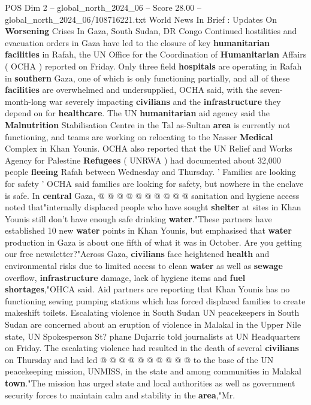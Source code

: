 \begin{textsample}{POS Dim 2 – global\_north\_2024\_06 – Score 28.00 – global\_north\_2024\_06/108716221.txt}  \label{ex:f2_pos_257}
World News In Brief : Updates On \textbf{Worsening} Crises In Gaza, South Sudan, DR Congo Continued hostilities and evacuation orders in Gaza have led to the closure of key \textbf{humanitarian} \textbf{facilities} in Rafah, the UN Office for the Coordination of \textbf{Humanitarian} Affairs ( OCHA ) reported on Friday.
Only three field \textbf{hospitals} are operating in Rafah in \textbf{southern} Gaza, one of which is only functioning partially, and all of these \textbf{facilities} are overwhelmed and undersupplied, OCHA said, with the seven-month-long war severely impacting \textbf{civilians} and the \textbf{infrastructure} they depend on for \textbf{healthcare}.
The UN \textbf{humanitarian} aid agency said the \textbf{Malnutrition} Stabilisation Centre in the Tal as-Sultan \textbf{area} is currently not functioning, and teams are working on relocating to the Nasser \textbf{Medical} Complex in Khan Younis.
OCHA also reported that the UN Relief and Works Agency for Palestine \textbf{Refugees} ( UNRWA ) had documented about 32,000 people \textbf{fleeing} Rafah between Wednesday and Thursday. ' Families are looking for safety ' OCHA said families are looking for safety, but nowhere in the enclave is safe.
In \textbf{central} Gaza, @ @ @ @ @ @ @ @ @ @ sanitation and hygiene access noted that"internally displaced people who have sought \textbf{shelter} at sites in Khan Younis still don't have enough safe drinking \textbf{water}."These partners have established 10 new \textbf{water} points in Khan Younis, but emphasised that \textbf{water} production in Gaza is about one fifth of what it was in October.
Are you getting our free newsletter?"Across Gaza, \textbf{civilians} face heightened \textbf{health} and environmental risks due to limited access to clean \textbf{water} as well as \textbf{sewage} overflow, \textbf{infrastructure} damage, lack of hygiene items and \textbf{fuel} \textbf{shortages},"OHCA said.
Aid partners are reporting that Khan Younis has no functioning sewing pumping stations which has forced displaced families to create makeshift toilets.
Escalating violence in South Sudan UN peacekeepers in South Sudan are concerned about an eruption of violence in Malakal in the Upper Nile state, UN Spokesperson St? phane Dujarric told journalists at UN Headquarters on Friday.
The escalating violence had resulted in the death of several \textbf{civilians} on Thursday and had led @ @ @ @ @ @ @ @ @ @ to the base of the UN peacekeeping mission, UNMISS, in the state and among communities in Malakal \textbf{town}."The mission has urged state and local authorities as well as government security forces to maintain calm and stability in the \textbf{area},"Mr.

\end{textsample}
